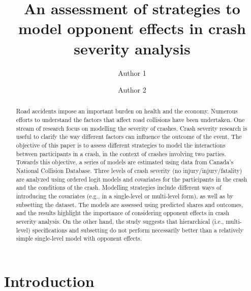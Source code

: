 \documentclass[]{elsarticle} %
\begin{document}
\begin{frontmatter}

  \title{An assessment of strategies to model opponent effects in crash severity
analysis}
    \author[Some University]{Author 1}
    \author[Some Institute of Technology]{Author 2}
  
      \address[Some University]{Department, Street, City, State, Zip}
    \address[Some Institute of Technology]{Department, Street, City, State, Zip}
  
  \begin{abstract}
  Road accidents impose an important burden on health and the economy.
  Numerous efforts to understand the factors that affect road collisions
  have been undertaken. One stream of research focus on modelling the
  severity of crashes. Crash severity research is useful to clarify the
  way different factors can influence the outcome of the event. The
  objective of this paper is to assess different strategies to model the
  interactions between participants in a crash, in the context of crashes
  involving two parties. Towards this objective, a series of models are
  estimated using data from Canada's National Collision Database. Three
  levels of crash severity (no injury/injury/fatality) are analyzed using
  ordered logit models and covariates for the participants in the crash
  and the conditions of the crash. Modelling strategies include different
  ways of introducing the covariates (e.g., in a single-level or
  multi-level form), as well as by subsetting the dataset. The models are
  assessed using predicted shares and outcomes, and the results highlight
  the importance of considering opponent effects in crash severity
  analysis. On the other hand, the study suggests that hierarchical (i.e.,
  multi-level) specifications and subsetting do not perform necessarily
  better than a relatively simple single-level model with opponent
  effects.
  \end{abstract}
  
 \end{frontmatter}

\hypertarget{introduction}{%
\section{Introduction}\label{introduction}}
\end{document}
